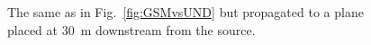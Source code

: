 \documentclass{iopconfser}
\newcommand{\todo}[1]{{\color{red}[TODO: "#1'']}}
\begin{document}
\begin{figure}
        
    \caption{The same as in Fig.~\ref{fig:GSMvsUND} but propagated to a plane placed at \SI{30}{m} downstream from the source.
    }
    \label{fig:GSMvsUND-propagated}
\end{figure}


        


        


\end{document}
